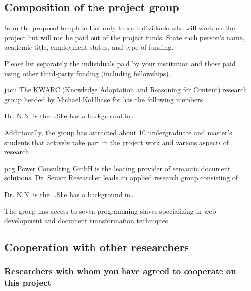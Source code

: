 \subsection{Composition of the project group }

\begin{todo}{from the proposal template}
List only those individuals who will work on the project but will not be paid out of the
project funds. State each person’s name, academic title, employment status, and type
of funding.

Please list separately the individuals paid by your institution and those paid using other
third-party funding (including fellowships).
\end{todo}
\begin{sitedescription}{jacu}
The KWARC (Knowledge Adaptation and Reasoning for Content) research group headed by
Michael Kohlhase for has the following members
\begin{compactdesc}
\item[Dr. N.N.] is the \ldots She has a background in\ldots.
\end{compactdesc}
Additionally, the group has attracted about 10 undergraduate and master's students that
actively take part in the project work and various aspects of research.
\end{sitedescription}
\begin{sitedescription}{pcg}
Power Consulting GmbH is the leading provider of semantic document solutions. Dr. Senior
Researcher leads an applied research group consisting of 
\begin{compactdesc}
\item[Dr. N.N.] is the \ldots She has a background in\ldots.
\end{compactdesc}
The group has access to seven programming slaves specializing in web development and
document transformation techniques
\end{sitedescription}


\subsection{Cooperation with other researchers }

\subsubsection{Researchers with whom you have agreed to cooperate on this project }

